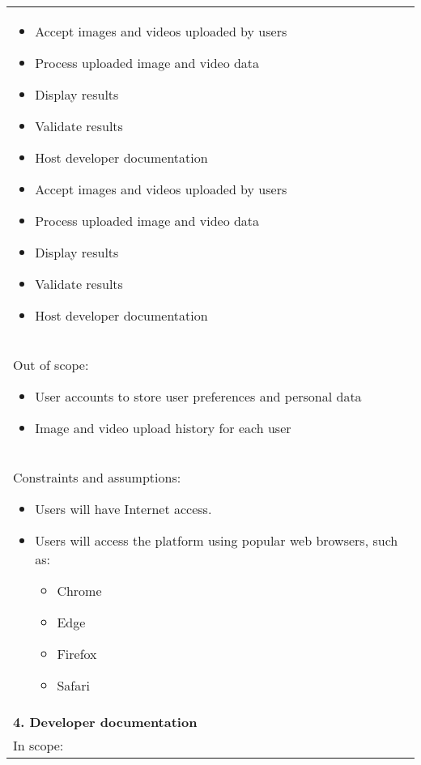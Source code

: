 \begin{longtable}{ | p{} l | }
{\begin{itemize}
            \item Accept images and videos uploaded by users
            \item Process uploaded image and video data
            \item Display results
            \item Validate results
            \item Host developer documentation
            \item Accept images and videos uploaded by users
            \item Process uploaded image and video data
            \item Display results
            \item Validate results
            \item Host developer documentation
        \end{itemize}
    } \\
    \multicolumn{2}{|p{\textwidth}|}{\hspace{0.6cm}Out of scope:
        \begin{itemize}
            \item User accounts to store user preferences and personal data
            \item Image and video upload history for each user
        \end{itemize}
    } \\
    \multicolumn{2}{|p{\textwidth}|}{\hspace{0.6cm}Constraints and assumptions:
        \begin{itemize}
            \item Users will have Internet access.
            \item Users will access the platform using popular web browsers, such as:
                \begin{itemize}
                    \item Chrome
                    \item Edge
                    \item Firefox
                    \item Safari
                \end{itemize}
        \end{itemize}
    } \\
    \multicolumn{2}{|p{\textwidth}|}{\textbf{4. Developer documentation}} \\
    \multicolumn{2}{|p{\textwidth}|}{\hspace{0.6cm}In scope:
}
\end{longtable}
